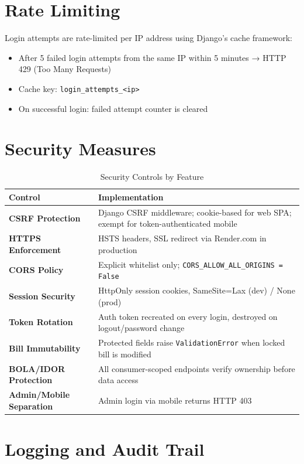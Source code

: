\documentclass[12pt, a4paper]{report}
\newenvironment{featurelist}{%
    \begin{itemize}[leftmargin=1.5em, itemsep=2pt, parsep=0pt]
}{%
    \end{itemize}
}
\begin{document}
\section{Rate Limiting}

Login attempts are rate-limited per IP address using Django's cache framework:
\begin{featurelist}
    \item After 5 failed login attempts from the same IP within 5 minutes → HTTP 429 (Too Many Requests)
    \item Cache key: \texttt{login\_attempts\_<ip>}
    \item On successful login: failed attempt counter is cleared
\end{featurelist}

\section{Security Measures}

\begin{table}[H]
\centering
\caption{Security Controls by Feature}
\begin{tabularx}{\textwidth}{>{\bfseries}l X}
\toprule
\textbf{Control} & \textbf{Implementation} \\
\midrule
CSRF Protection & Django CSRF middleware; cookie-based for web SPA; exempt for token-authenticated mobile \\
HTTPS Enforcement & HSTS headers, SSL redirect via Render.com in production \\
CORS Policy & Explicit whitelist only; \texttt{CORS\_ALLOW\_ALL\_ORIGINS = False} \\
Session Security & HttpOnly session cookies, SameSite=Lax (dev) / None (prod) \\
Token Rotation & Auth token recreated on every login, destroyed on logout/password change \\
Bill Immutability & Protected fields raise \texttt{ValidationError} when locked bill is modified \\
BOLA/IDOR Protection & All consumer-scoped endpoints verify ownership before data access \\
Admin/Mobile Separation & Admin login via mobile returns HTTP 403 \\
\bottomrule
\end{tabularx}
\end{table}

\section{Logging and Audit Trail}
\end{document}
